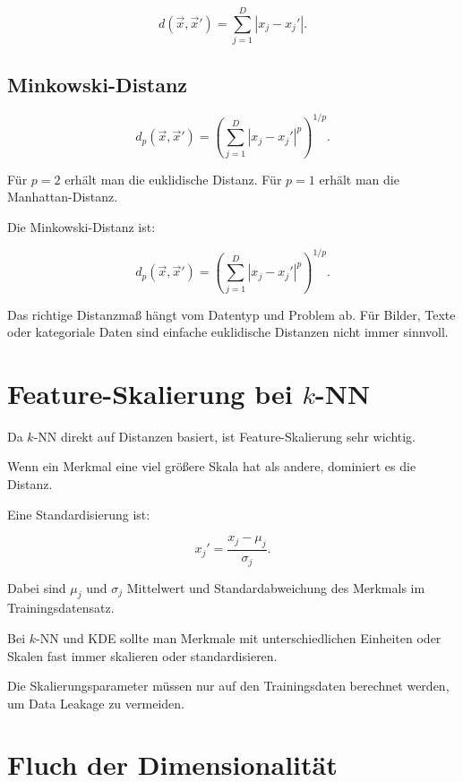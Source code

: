\[
    d(\vec{x},\vec{x}')
    =
    \sum_{j=1}^{D}
    |x_j-x_j'|.
\]

\subsection{Minkowski-Distanz}

\[
    d_p(\vec{x},\vec{x}')
    =
    \left(
        \sum_{j=1}^{D}
        |x_j-x_j'|^p
    \right)^{1/p}.
\]

Für \(p=2\) erhält man die euklidische Distanz.
Für \(p=1\) erhält man die Manhattan-Distanz.

\begin{definitionbox}
Die Minkowski-Distanz ist:

\[
    d_p(\vec{x},\vec{x}')
    =
    \left(
        \sum_{j=1}^{D}
        |x_j-x_j'|^p
    \right)^{1/p}.
\]
\end{definitionbox}

\begin{notebox}
Das richtige Distanzmaß hängt vom Datentyp und Problem ab.
Für Bilder, Texte oder kategoriale Daten sind einfache euklidische Distanzen nicht immer sinnvoll.
\end{notebox}

\section{Feature-Skalierung bei \(k\)-NN}

Da \(k\)-NN direkt auf Distanzen basiert, ist Feature-Skalierung sehr wichtig.

Wenn ein Merkmal eine viel größere Skala hat als andere, dominiert es die Distanz.

Eine Standardisierung ist:

\[
    x_j'
    =
    \frac{x_j-\mu_j}{\sigma_j}.
\]

Dabei sind \(\mu_j\) und \(\sigma_j\) Mittelwert und Standardabweichung des Merkmals im Trainingsdatensatz.

\begin{examtipbox}
Bei \(k\)-NN und KDE sollte man Merkmale mit unterschiedlichen Einheiten oder Skalen fast immer skalieren oder standardisieren.

Die Skalierungsparameter müssen nur auf den Trainingsdaten berechnet werden, um Data Leakage zu vermeiden.
\end{examtipbox}

\section{Fluch der Dimensionalität}

